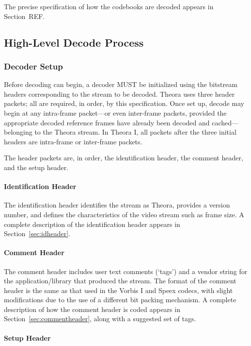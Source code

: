 \documentclass[11pt,letterpaper]{article}
\begin{document}
The precise specification of how the codebooks are decoded appears in
 Section~REF.

\subsection{High-Level Decode Process}

\subsubsection{Decoder Setup}

Before decoding can begin, a decoder MUST be initialized using the bitstream
 headers corresponding to the stream to be decoded.
Theora uses three header packets; all are required, in order, by this
 specification.
Once set up, decode may begin at any intra-frame packet---or even inter-frame
 packets, provided the appropriate decoded reference frames have already been
 decoded and cached---belonging to the Theora stream.
In Theora I, all packets after the three initial headers are intra-frame or
 inter-frame packets.

The header packets are, in order, the identification header, the comment
 header, and the setup header.

\paragraph{Identification Header}

The identification header identifies the stream as Theora, provides a version
 number, and defines the characteristics of the video stream such as frame
 size.
A complete description of the identification header appears in
 Section~\ref{sec:idheader}.

\paragraph{Comment Header}

The comment header includes user text comments (`tags') and a vendor string
 for the application/library that produced the stream.
The format of the comment header is the same as that used in the Vorbis I and
 Speex codecs, with slight modifications due to the use of a different bit
 packing mechanism.
A complete description of how the comment header is coded appears in
 Section~\ref{sec:commentheader}, along with a suggested set of tags.

\paragraph{Setup Header}
\end{document}
